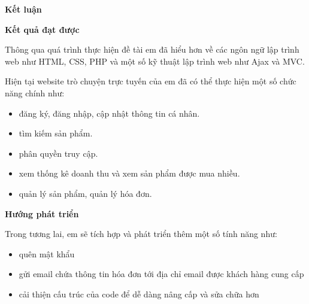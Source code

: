 \noindent\textbf{Kết luận}

\textbf{Kết quả đạt được}

Thông qua quá trình thực hiện đề tài em đã hiểu hơn về các ngôn ngữ lập
trình web như HTML, CSS, PHP và một số kỹ thuật lập trình web như Ajax và
MVC.

Hiện tại website trò chuyện trực tuyến của em đã có thể thực hiện một số chức năng chính như:
\begin{itemize}
    \vspace{-1em}
    \itemsep0em
    \item đăng ký, đăng nhập, cập nhật thông tin cá nhân.
    \item tìm kiếm sản phẩm.
    \item phân quyền truy cập.
    \item xem thống kê doanh thu và xem sản phẩm được mua nhiều.
    \item quản lý sản phẩm, quản lý hóa đơn.
    \vspace{-1em}
\end{itemize}

\textbf{Hướng phát triển}

Trong tương lai, em sẽ tích hợp và phát triển thêm một số tính năng như:

\begin{itemize}
    \vspace{-1em}
    \itemsep0em
    \item quên mật khẩu
    \item gửi email chứa thông tin hóa đơn tới địa chỉ email được khách hàng cung cấp
    \item cải thiện cấu trúc của code để dễ dàng nâng cấp và sửa chữa hơn
    \vspace{-1em}
\end{itemize}

